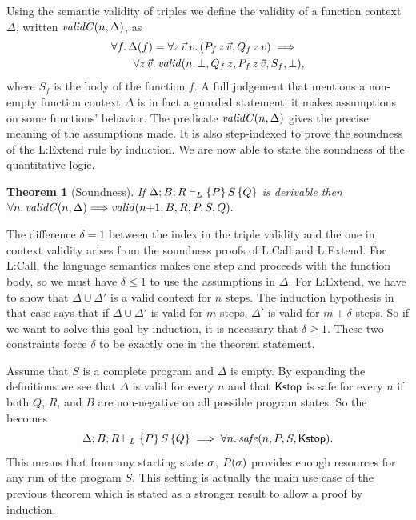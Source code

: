 \documentclass[nocopyrightspace,preprint,pldi]{sigplanconf-pldi15}
\newcommand{\pref}[1]{\prettyref{#1}}
\newtheorem{theorem}{Theorem}
\begin{document}
{Using the semantic validity of triples we define the validity
of a function context $\Delta$, written $\mathit{validC}(n,\Delta)$, as
\begin{align*}
  &\forall f .\, \Delta(f) =
    \forall z \, \vec v \, v .\, (P_f \, z \, \vec v, Q_f \, z \, v)
    \implies \\
  &\qquad \forall z \, \vec v .\,
  \mathit{valid}(n,\bot,Q_f \, z,P_f \, z \, \vec v,S_f,\bot) ,
\end{align*}
where $S_f$ is the body of the function $f$. A full
judgement that mentions a non-empty function context
$\Delta$ is in fact a guarded statement: it makes
assumptions on some functions' behavior.  The predicate
$\mathit{validC}(n,\Delta)$ gives the precise meaning of the
assumptions made.  It is also step-indexed to prove the
soundness of the {\sc L:Extend} rule by induction.
%
We are now able to state the soundness of the quantitative logic.
%
\begin{theorem}[Soundness]
  \label{thm:sound}
  If $\Delta; B; R \vdash_L \{P\}\, S\, \{Q\}$ is derivable then
  $
    \forall n .\, \mathit{validC}(n,\Delta)
      {\implies} \mathit{valid}(n {+} 1,B,R,P,S,Q).
  $
\end{theorem}
%
\noindent
The difference $\delta = 1$ between the index in the triple
validity and the one in context validity arises from
the soundness proofs of {\sc L:Call} and {\sc L:Extend}.  For
{\sc L:Call}, the language semantics makes one step and
proceeds with the function body, so we must have
$\delta \le 1$ to use the assumptions in $\Delta$.
For {\sc L:Extend}, we have to show that $\Delta \cup \Delta'$
is a valid context for $n$ steps.  The induction hypothesis
in that case says that if $\Delta \cup \Delta'$ is valid
for $m$ steps, $\Delta'$ is valid for $m+\delta$ steps.
So if we want to solve this goal by induction, it is
necessary that $\delta \ge 1$.  These two constraints force
$\delta$ to be exactly one in the theorem statement.

Assume that $S$ is a complete program and $\Delta$ is empty.  By
expanding the definitions we see that $\Delta$ is valid
for every $n$ and that $\mathsf{Kstop}$ is safe for every $n$ if both
$Q$, $R$, and $B$ are non-negative on all possible program
states. So the \pref{thm:sound} becomes
$$
\Delta; B; R \vdash_L \{P\}\, S\, \{Q\} \implies   \forall n .\, \mathit{safe}(n,P,S,\mathsf{Kstop}).
$$
This means that from any starting state $\sigma$, $P(\sigma)$
provides enough resources for any run of the program $S$.  This
setting is actually the main use case of the previous theorem
which is stated as a stronger result to allow a proof by
induction.




}
\end{document}
